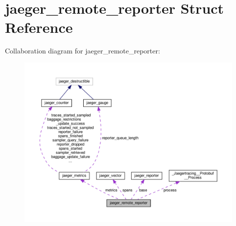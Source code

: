 \hypertarget{structjaeger__remote__reporter}{}\section{jaeger\+\_\+remote\+\_\+reporter Struct Reference}
\label{structjaeger__remote__reporter}


Collaboration diagram for jaeger\+\_\+remote\+\_\+reporter\+:
\nopagebreak
\begin{figure}[H]
\begin{center}
\leavevmode
\includegraphics[width=350pt]{structjaeger__remote__reporter__coll__graph}
\end{center}
\end{figure}
